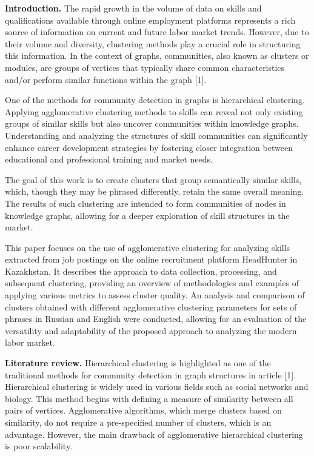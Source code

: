 \begin{multicols}{2}
{\bfseries Introduction.} The rapid growth in the volume of data on skills
and qualifications available through online employment platforms
represents a rich source of information on current and future labor
market trends. However, due to their volume and diversity, clustering
methods play a crucial role in structuring this information. In the
context of graphs, communities, also known as clusters or modules, are
groups of vertices that typically share common characteristics and/or
perform similar functions within the graph {[}1{]}.

One of the methods for community detection in graphs is hierarchical
clustering. Applying agglomerative clustering methods to skills can
reveal not only existing groups of similar skills but also uncover
communities within knowledge graphs. Understanding and analyzing the
structures of skill communities can significantly enhance career
development strategies by fostering closer integration between
educational and professional training and market needs.

The goal of this work is to create clusters that group semantically
similar skills, which, though they may be phrased differently, retain
the same overall meaning. The results of such clustering are intended to
form communities of nodes in knowledge graphs, allowing for a deeper
exploration of skill structures in the market.

This paper focuses on the use of agglomerative clustering for analyzing
skills extracted from job postings on the online recruitment platform
HeadHunter in Kazakhstan. It describes the approach to data collection,
processing, and subsequent clustering, providing an overview of
methodologies and examples of applying various metrics to assess cluster
quality. An analysis and comparison of clusters obtained with different
agglomerative clustering parameters for sets of phrases in Russian and
English were conducted, allowing for an evaluation of the versatility
and adaptability of the proposed approach to analyzing the modern labor
market.

{\bfseries Literature review.} Hierarchical clustering is highlighted as
one of the traditional methods for community detection in graph
structures in article {[}1{]}. Hierarchical clustering is widely used in
various fields such as social networks and biology. This method begins
with defining a measure of similarity between all pairs of vertices.
Agglomerative algorithms, which merge clusters based on similarity, do
not require a pre-specified number of clusters, which is an advantage.
However, the main drawback of agglomerative hierarchical clustering is
poor scalability.


\end{multicols}

